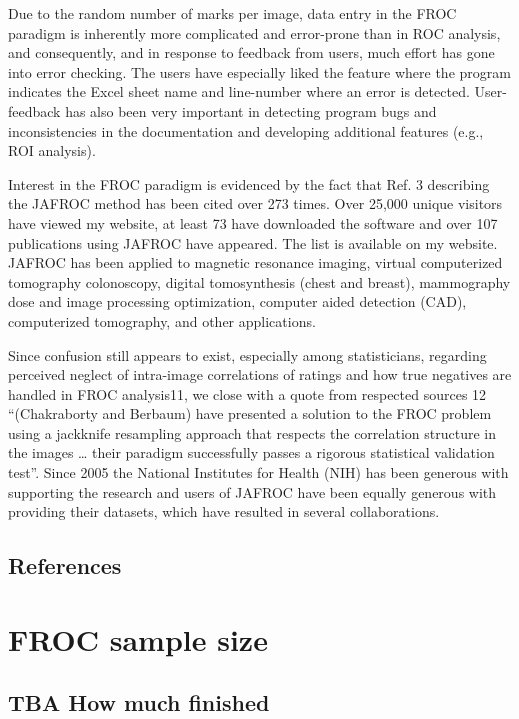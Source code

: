\documentclass[
]{book}
\begin{document}
Due to the random number of marks per image, data entry in the FROC paradigm is inherently more complicated and error-prone than in ROC analysis, and consequently, and in response to feedback from users, much effort has gone into error checking. The users have especially liked the feature where the program indicates the Excel sheet name and line-number where an error is detected. User-feedback has also been very important in detecting program bugs and inconsistencies in the documentation and developing additional features (e.g., ROI analysis).

Interest in the FROC paradigm is evidenced by the fact that Ref. 3 describing the JAFROC method has been cited over 273 times. Over 25,000 unique visitors have viewed my website, at least 73 have downloaded the software and over 107 publications using JAFROC have appeared. The list is available on my website. JAFROC has been applied to magnetic resonance imaging, virtual computerized tomography colonoscopy, digital tomosynthesis (chest and breast), mammography dose and image processing optimization, computer aided detection (CAD), computerized tomography, and other applications.

Since confusion still appears to exist, especially among statisticians, regarding perceived neglect of intra-image correlations of ratings and how true negatives are handled in FROC analysis11, we close with a quote from respected sources 12 ``(Chakraborty and Berbaum) have presented a solution to the FROC problem using a jackknife resampling approach that respects the correlation structure in the images \ldots{} their paradigm successfully passes a rigorous statistical validation test''. Since 2005 the National Institutes for Health (NIH) has been generous with supporting the research and users of JAFROC have been equally generous with providing their datasets, which have resulted in several collaborations.

\hypertarget{analyzing-froc-data-references}{%
\section{References}\label{analyzing-froc-data-references}}

\hypertarget{froc-sample-size}{%
\chapter{FROC sample size}\label{froc-sample-size}}

\hypertarget{froc-sample-size-how-much-finished}{%
\section{TBA How much finished}\label{froc-sample-size-how-much-finished}}
\end{document}
